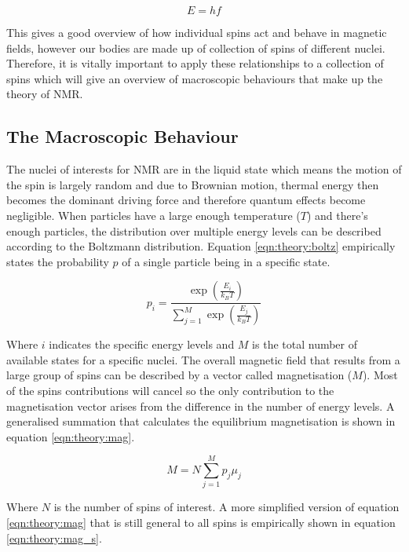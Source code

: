 \documentclass[class=article, crop=false]{standalone}
\begin{document}
\begin{equation}
    E = hf
    \label{eqn:theory:ELamor}
\end{equation}

This gives a good overview of how individual spins act and behave in magnetic fields, however our bodies are made up of collection of spins of different nuclei. Therefore, it is vitally important to apply these relationships to a collection of spins which will give an overview of macroscopic behaviours that make up the theory of NMR.

\subsection{The Macroscopic Behaviour}

The nuclei of interests for NMR are in the liquid state which means the motion of the spin is largely random and due to Brownian motion, thermal energy then becomes the dominant driving force and therefore quantum effects become negligible. When particles have a large enough temperature ($T$) and there's enough particles, the distribution over multiple energy levels can be described according to the Boltzmann distribution\cite{Boltzmann1872WeitereGasmolekulen}. Equation \ref{eqn:theory:boltz} empirically states the probability $p$ of a single particle being in a specific state.

\begin{equation}
    p_i = \frac{\exp\left(\frac{E_i}{k_BT}\right)}{\displaystyle \sum_{j = 1}^{M}\exp\left(\frac{E_j}{k_BT}\right)}
    \label{eqn:theory:boltz}
\end{equation}

Where $i$ indicates the specific energy levels and $M$ is the total number of available states for a specific nuclei. The overall magnetic field that results from a large group of spins can be described by a vector called magnetisation ($M$). Most of the spins contributions will cancel so the only contribution to the magnetisation vector arises from the difference in the number of energy levels. A generalised summation that calculates the equilibrium magnetisation is shown in equation \ref{eqn:theory:mag}.

\begin{equation}
    M = N\sum_{j = 1}^{M}p_j\mu_j
    \label{eqn:theory:mag}
\end{equation}

Where $N$ is the number of spins of interest. A more simplified version of equation \ref{eqn:theory:mag} that is still general to all spins is empirically shown in equation \ref{eqn:theory:mag_s}.
\end{document}
